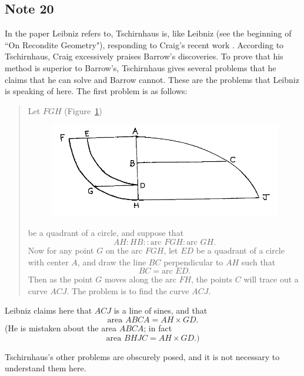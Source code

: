 \documentclass[polutonikogreek,english,twoside,openright]{article}
\begin{document}

\subsection*{Note 20}
\label{crg20}

In the paper Leibniz refers to, Tschirnhaus is, like Leibniz (see the
beginning of ``On Recondite Geometry"), responding to Craig's recent
work .  According to Tschirnhaus, Craig excessively praises Barrow's
discoveries. To prove that his method is superior to Barrow's,
Tschirnhaus gives several problems that he claims that he can solve
and Barrow cannot.  These are the problems that Leibniz is speaking of
here.  The first problem is as follows:
\begin{quote}
Let $FGH$ (Figure~\ref{Tschirn1A})
\begin{figure}[htp]
\begin{center}
\includegraphics[width=.75\textwidth]{fig/Figure54a}
\caption{}
\label{Tschirn1A}
\vspace{-10pt}
\end{center}
\end{figure} 
 be a quadrant of a circle, and suppose that
$$AH \!:\! HB :: \mbox{arc }FGH \!:\! \mbox{arc }GH.$$
Now for any point $G$ on the arc $FGH$, let $ED$ be a quadrant of a
circle with center $A$, and draw the line $BC$ perpendicular to $AH$
such that
$$BC = \mbox{arc }ED.$$
Then as the point $G$ moves along the arc $FH$, the points $C$ will
trace out a curve $ACJ$.  The problem is to find the curve $ACJ$.
\end{quote}

 Leibniz claims here that $ACJ$ is a line of sines, and that 
$$\mbox{area }ABCA = AH \times GD.$$
(He is mistaken about the area $ABCA$; in fact
$$\mbox{area }BHJC = AH \times GD.)$$

Tschirnhaus's other problems are obscurely posed, and it is not necessary to understand them here.

\setcounter{footnote}{0}
\setcounter{figure}{0}
\end{document}
